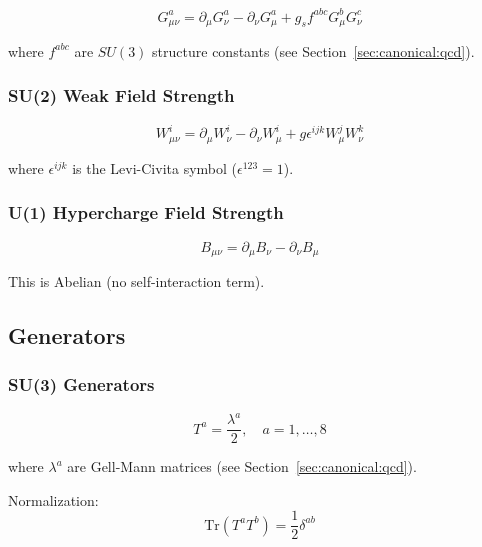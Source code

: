 \begin{equation}
\label{eq:canonical:sm_gluon}
G^a_{\mu\nu} = \partial_\mu G^a_\nu - \partial_\nu G^a_\mu + g_s f^{abc} G^b_\mu G^c_\nu
\end{equation}

where $f^{abc}$ are $SU(3)$ structure constants (see Section~\ref{sec:canonical:qcd}).

\subsubsection{SU(2) Weak Field Strength}

\begin{equation}
\label{eq:canonical:sm_weak}
W^i_{\mu\nu} = \partial_\mu W^i_\nu - \partial_\nu W^i_\mu + g \epsilon^{ijk} W^j_\mu W^k_\nu
\end{equation}

where $\epsilon^{ijk}$ is the Levi-Civita symbol ($\epsilon^{123} = 1$).

\subsubsection{U(1) Hypercharge Field Strength}

\begin{equation}
\label{eq:canonical:sm_hypercharge}
B_{\mu\nu} = \partial_\mu B_\nu - \partial_\nu B_\mu
\end{equation}

This is Abelian (no self-interaction term).

\subsection{Generators}

\subsubsection{SU(3) Generators}

\begin{equation}
T^a = \frac{\lambda^a}{2}, \quad a = 1, \ldots, 8
\end{equation}

where $\lambda^a$ are Gell-Mann matrices (see Section~\ref{sec:canonical:qcd}).

Normalization:
\begin{equation}
\text{Tr}(T^a T^b) = \frac{1}{2}\delta^{ab}
\end{equation}

